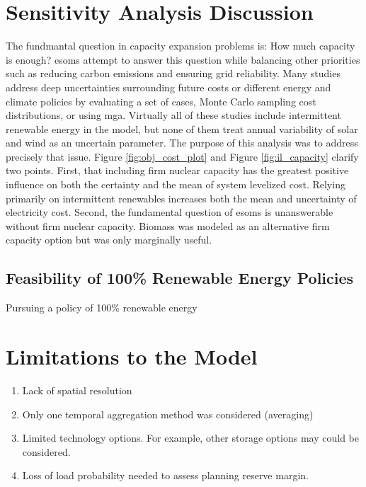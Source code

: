 \section{Sensitivity Analysis Discussion}

The fundmantal question in capacity expansion problems is: How much capacity is enough?
\glspl{esom} attempt to answer this question while balancing other priorities such
as reducing carbon emissions and ensuring grid reliability. Many studies address
deep uncertainties surrounding future costs
\cite{alzbutas_uncertainty_2012,barron_differential_2015,komiyama_energy_2015,
li_open_2020,yue_least_2020} or different energy and climate policies \cite{bennett_extending_2021,
bouckaert_expanding_2014,de_sisternes_value_2016,decarolis_modelling_2016,neumann_near-optimal_2021,
seck_embedding_2020} by evaluating a set of cases, Monte Carlo sampling cost distributions,
or using \gls{mga}. Virtually all of these studies include intermittent renewable
energy in the model, but none of them treat annual variability of solar and wind
as an uncertain parameter. The purpose of this analysis was to address precisely
that issue. Figure \ref{fig:obj_cost_plot} and Figure \ref{fig:il_capacity} clarify
two points. First, that including firm nuclear capacity has the greatest positive
influence on both the certainty and the mean of system levelized cost. Relying primarily
on intermittent renewables increases both the mean and uncertainty of electricity cost.
Second, the fundamental question of \glspl{esom} is unanswerable without firm nuclear capacity.
Biomass was modeled as an alternative firm capacity option but was only marginally
useful.

\subsection{Feasibility of 100\% Renewable Energy Policies}

Pursuing a policy of 100\% renewable energy 


\section{Limitations to the Model}
\begin{enumerate}
  \item Lack of spatial resolution
  \item Only one temporal aggregation method was considered (averaging)
  \item Limited technology options. For example, other storage options may
  could be considered.
  \item Loss of load probability needed to assess planning reserve margin.
\end{enumerate}
